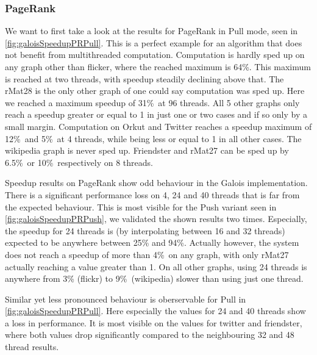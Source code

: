 \subsubsection{PageRank}
We want to first take a look at the results for PageRank in Pull mode, seen in \autoref{fig:galoisSpeedupPRPull}. This is a perfect example for an algorithm that does not benefit from multithreaded computation. 
Computation is hardly sped up on any graph other than flicker, where the reached maximum is 64\%. This maximum is reached at two threads, with speedup steadily declining above that.
The rMat28 is the only other graph of one could say computation was sped up. Here we reached a maximum speedup of 31\%\ at 96 threads.
All 5 other graphs only reach a speedup greater or equal to 1 in just one or two cases and if so only by a small margin.
Computation on Orkut and Twitter reaches a speedup maximum of 12\%\ and 5\%\ at 4 threads, while being less or equal to 1 in all other cases.
The wikipedia graph is never sped up.
Friendster and rMat27 can be sped up by 6.5\%\ or 10\%\ respectively on 8 threads.

Speedup results on PageRank show odd behaviour in the Galois implementation.
There is a significant performance loss on 4, 24 and 40 threads that is far from the expected behaviour. This is most visible for the Push variant seen in \autoref{fig:galoisSpeedupPRPush}, we validated the shown results two times.
Especially, the speedup for 24 threads is (by interpolating between 16 and 32 threads) expected to be anywhere between 25\% and 94\%.
Actually however, the system does not reach a speedup of more than 4\%\ on any graph, with only rMat27 actually reaching a value greater than 1. 
On all other graphs, using 24 threads is anywhere from 3\% (flickr) to 9\%\ (wikipedia) slower than using just one thread.

Similar yet less pronounced behaviour is oberservable for Pull in \autoref{fig:galoisSpeedupPRPull}. 
Here especially the values for 24 and 40 threads show a loss in performance.
It is most visible on the values for twitter and friendster, where both values drop significantly compared to the neighbouring 32 and 48 thread results.

